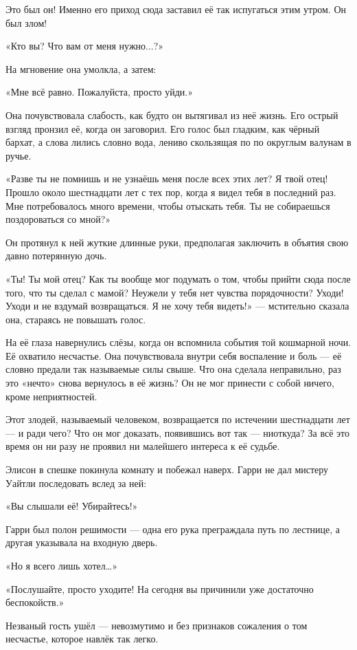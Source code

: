 \documentclass[a5paper, 9pt,
final, openany, twoside=true]{memoir}
\begin{document}
Это был он! Именно его приход сюда заставил её так испугаться этим утром. Он был злом!

«Кто вы? Что вам от меня нужно...?»

На мгновение она умолкла, а затем:

«Мне всё равно. Пожалуйста, просто уйди.»

Она почувствовала слабость, как будто он вытягивал из неё жизнь. Его острый взгляд пронзил её, когда он заговорил. Его голос был гладким, как чёрный бархат, а слова лились словно вода, лениво скользящая по по округлым валунам в ручье.

«Разве ты не помнишь и не узнаёшь меня после всех этих лет? Я твой отец! Прошло около шестнадцати лет с тех пор, когда я видел тебя в последний раз. Мне потребовалось много времени, чтобы отыскать тебя. Ты не собираешься поздороваться со мной?»

Он протянул к ней жуткие длинные руки, предполагая заключить в объятия свою давно потерянную дочь.

«Ты! Ты мой отец? Как ты вообще мог подумать о том, чтобы прийти сюда после того, что ты сделал с мамой? Неужели у тебя нет чувства порядочности? Уходи! Уходи и не вздумай возвращаться. Я не хочу тебя видеть!» — мстительно сказала она, стараясь не повышать голос.

На её глаза навернулись слёзы, когда он вспомнила события той кошмарной ночи. Её охватило несчастье. Она почувствовала внутри себя воспаление и боль — её словно предали так называемые силы свыше. Что она сделала неправильно, раз это «нечто» снова вернулось в её жизнь? Он не мог принести с собой ничего, кроме неприятностей.

Этот злодей, называемый человеком, возвращается по истечении шестнадцати лет — и ради чего? Что он мог доказать, появившись вот так — ниоткуда? За всё это время он ни разу не проявил ни малейшего интереса к её судьбе.

Элисон в спешке покинула комнату и побежал наверх. Гарри не дал мистеру Уайтли последовать вслед за ней:

«Вы слышали её! Убирайтесь!»

Гарри был полон решимости — одна его рука преграждала путь по лестнице, а другая указывала на входную дверь.

«Но я всего лишь хотел…»

«Послушайте, просто уходите! На сегодня вы причинили уже достаточно беспокойств.»

Незваный гость ушёл — невозмутимо и без признаков сожаления о том несчастье, которое навлёк так легко.
\end{document}
